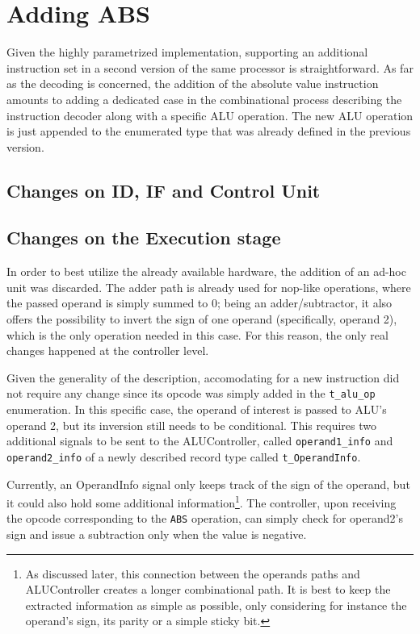 \section{Adding ABS}
Given the highly parametrized implementation, supporting an additional instruction set in a second version of the same processor is straightforward. As far as the decoding is concerned, the addition of the absolute value instruction amounts to adding a dedicated case in the combinational process describing the instruction decoder along with a specific ALU operation. The new ALU operation is just appended to the enumerated type that was already defined in the previous version.
\subsection{Changes on ID, IF and Control Unit}

\subsection{Changes on the Execution stage}
In order to best utilize the already available hardware, the addition of an ad-hoc unit was discarded. The adder path
is already used for nop-like operations, where the passed operand is simply summed to 0; being an adder/subtractor,
it also offers the possibility to invert the sign of one operand (specifically, operand 2), which is the only operation
needed in this case. For this reason, the only real changes happened at the controller level.

Given the generality of the description, accomodating for a new instruction did not require any change since its opcode
was simply added in the \texttt{t\_alu\_op} enumeration. In this specific case, the operand of interest is passed to
ALU's operand 2, but its inversion still needs to be conditional. This requires two additional signals to be sent to the
ALUController, called \texttt{operand1\_info} and \texttt{operand2\_info} of a newly described record type called
\texttt{t\_OperandInfo}.

Currently, an OperandInfo signal only keeps track of the sign of the operand, but it could also hold some additional
information\footnote{As discussed later, this connection between the operands paths and ALUController creates a longer
combinational path. It is best to keep the extracted information as simple as possible, only considering for instance
the operand's sign, its parity or a simple sticky bit.}. The controller, upon receiving the opcode corresponding to the
\texttt{ABS} operation, can simply check for operand2's sign and issue a subtraction only when the value is negative.


